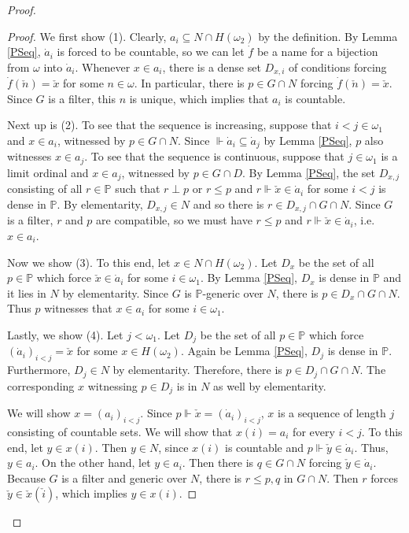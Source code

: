 \documentclass[a4paper]{amsart}
\theoremstyle{definition}
\theoremstyle{remark}
\theoremstyle{plain}
\numberwithin{mydef}{section}
\newcommand{\dP}{\mathbb{P}}
\begin{document}
\begin{proof}
		\begin{proof}
			We first show (1). Clearly, $a_i\subseteq N\cap H(\omega_2)$ by the definition. By Lemma \ref{PSeq}, $\dot{a}_i$ is forced to be countable, so we can let $\dot{f}$ be a name for a bijection from $\omega$ into $\dot{a}_i$. Whenever $x\in a_i$, there is a dense set $D_{x,i}$ of conditions forcing $\dot{f}(\check{n})=\check{x}$ for some $n\in\omega$. In particular, there is $p\in G\cap N$ forcing $\dot{f}(\check{n})=\check{x}$. Since $G$ is a filter, this $n$ is unique, which implies that $a_i$ is countable.
			
			Next up is (2). To see that the sequence is increasing, suppose that $i<j\in\omega_1$ and $x\in a_i$, witnessed by $p\in G\cap N$. Since $\Vdash\dot{a}_i\subseteq\dot{a}_j$ by Lemma \ref{PSeq}, $p$ also witnesses $x\in a_j$. To see that the sequence is continuous, suppose that $j\in\omega_1$ is a limit ordinal and $x\in a_j$, witnessed by $p\in G\cap D$. By Lemma \ref{PSeq}, the set $D_{x,j}$ consisting of all $r\in\dP$ such that $r\perp p$ or $r\leq p$ and $r\Vdash\check{x}\in\dot{a}_i$ for some $i<j$ is dense in $\dP$. By elementarity, $D_{x,j}\in N$ and so there is $r\in D_{x,j}\cap G\cap N$. Since $G$ is a filter, $r$ and $p$ are compatible, so we must have $r\leq p$ and $r\Vdash\check{x}\in\dot{a}_i$, i.e. $x\in a_i$.
			
			Now we show (3). To this end, let $x\in N\cap H(\omega_2)$. Let $D_x$ be the set of all $p\in\dP$ which force $\check{x}\in\dot{a}_i$ for some $i\in\omega_1$. By Lemma \ref{PSeq}, $D_x$ is dense in $\dP$ and it lies in $N$ by elementarity. Since $G$ is $\dP$-generic over $N$, there is $p\in D_x\cap G\cap N$. Thus $p$ witnesses that $x\in a_i$ for some $i\in\omega_1$.
			
			Lastly, we show (4). Let $j<\omega_1$. Let $D_j$ be the set of all $p\in\dP$ which force $(\dot{a}_i)_{i<j}=\check{x}$ for some $x\in H(\omega_2)$. Again be Lemma \ref{PSeq}, $D_j$ is dense in $\dP$. Furthermore, $D_j\in N$ by elementarity. Therefore, there is $p\in D_j\cap G\cap N$. The corresponding $x$ witnessing $p\in D_j$ is in $N$ as well by elementarity.
			
			We will show $x=(a_i)_{i<j}$. Since $p\Vdash\check{x}=(\dot{a}_i)_{i<j}$, $x$ is a sequence of length $j$ consisting of countable sets. We will show that $x(i)=a_i$ for every $i<j$. To this end, let $y\in x(i)$. Then $y\in N$, since $x(i)$ is countable and $p\Vdash\check{y}\in\dot{a}_i$. Thus, $y\in a_i$. On the other hand, let $y\in a_i$. Then there is $q\in G\cap N$ forcing $\check{y}\in\dot{a}_i$. Because $G$ is a filter and generic over $N$, there is $r\leq p,q$ in $G\cap N$. Then $r$ forces $\check{y}\in\check{x}(\check{i})$, which implies $y\in x(i)$.
		\end{proof}
		

\end{proof}
\end{document}
